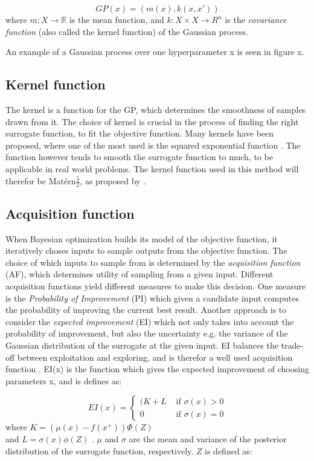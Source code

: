 \begin{equation}\label{gaussian-process}
GP(x) = (m(x), k(x, x'))
\end{equation}
where $m : X \rightarrow \mathbb{R}$ is the mean function, and $k : X \times X \rightarrow R^n$ is the \emph{covariance function} (also called the kernel function) of the Gaussian process.

An example of a Gaussian process over one hyperparameter x is seen in figure x. 

\subsection{Kernel function}
The kernel is a function for the GP, which determines the smoothness of samples drawn from it. The choice of kernel is crucial in the process of finding the right surrogate function, to fit the objective function. Many kernels have been proposed, where one of the most used is the squared exponential function \citet{brochu2010tutorial}. The function however tends to smooth the surrogate function to much, to be applicable in real world problems. The kernel function used in this method will therefor be Matérn$\frac{5}{2}$, as proposed by \citet{snoek2012practical}.

\subsection{Acquisition function}
When Bayesian optimization builds its model of the objective function, it iteratively choses inputs to sample outputs from the objective function. The choice of which inputs to sample from is determined by the \emph{acquisition function} (AF), which determines utility of sampling from a given input. Different acquisition functions yield different measures to make this decision. One measure is the \emph{Probability of Improvement} (PI) which given a candidate input computes the probability of improving the current best result.  Another approach is to consider the \emph{expected improvement} (EI) which not only takes into account the probability of improvement, but also the uncertainty e.g. the variance of the Gaussian distribution of the surrogate at the given input.
EI balances the trade-off between exploitation and exploring, and is therefor a well used acquisition function \citet{brochu2010tutorial}. EI(x) is the function which gives the expected improvement of choosing parameters x, and is defines as:

\begin{equation}
\label{eq:expected-improvement}
EI(x) =
\begin{cases}
   (K + L & \text{ if } \sigma(x) > 0\\
   0 	  & \text{ if } \sigma(x) = 0
\end{cases}
\end{equation}
where $K = (\mu(x) - f(x^+))\Phi(Z)$ \\and $L = \sigma(x)\phi(Z)$ .
$\mu$ and $\sigma$ are the mean and variance of the posterior distribution of the surrogate function, respectively. $Z$ is defined as:

